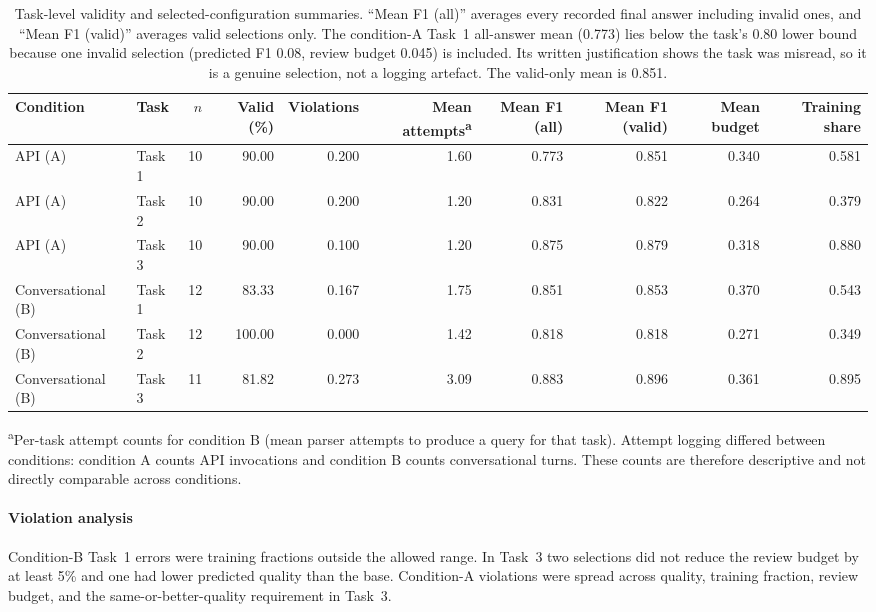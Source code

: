 \documentclass[final,5p,times,twocolumn]{elsarticle}
\begin{document}
\begin{table}[!tb]
\centering
\footnotesize
\caption{Task-level validity and selected-configuration summaries.
``Mean F1 (all)'' averages every recorded final answer including invalid ones, and ``Mean F1 (valid)'' averages valid selections only. The condition-A
Task~1 all-answer mean (0.773) lies below the task's 0.80 lower bound
because one invalid selection (predicted F1 0.08, review budget 0.045) is included. Its written justification shows the task was misread, so it is a genuine selection, not a logging artefact. The valid-only mean is 0.851.}
\label{tab:user-study-validity}
\setlength{\tabcolsep}{2.5pt}
\begin{tabular}{@{}llrrrrrrrr@{}}
\toprule
Condition & Task & $n$ & Valid (\%) & Violations & Mean attempts\textsuperscript{a} &
Mean F1 (all) & Mean F1 (valid) & Mean budget & Training share \\
\midrule
API (A) & Task 1 & 10 & 90.00 & 0.200 & 1.60 & 0.773 & 0.851 & 0.340 & 0.581 \\
API (A) & Task 2 & 10 & 90.00 & 0.200 & 1.20 & 0.831 & 0.822 & 0.264 & 0.379 \\
API (A) & Task 3 & 10 & 90.00 & 0.100 & 1.20 & 0.875 & 0.879 & 0.318 & 0.880 \\
Conversational (B)  & Task 1 & 12 & 83.33 & 0.167 & 1.75 & 0.851 & 0.853 & 0.370 & 0.543 \\
Conversational (B)  & Task 2 & 12 & 100.00 & 0.000 & 1.42 & 0.818 & 0.818 & 0.271 & 0.349 \\
Conversational (B)  & Task 3 & 11 & 81.82 & 0.273 & 3.09 & 0.883 & 0.896 & 0.361 & 0.895 \\
\bottomrule
\end{tabular}
\smallskip

\noindent\textsuperscript{a}Per-task attempt counts for condition B
(mean parser attempts to produce a query for that task). Attempt logging
differed between conditions: condition A counts API invocations and condition B counts conversational turns. These counts are therefore descriptive
and not directly comparable across conditions.
\end{table}

\paragraph{Violation analysis}
Condition-B Task~1 errors were training fractions outside the allowed range. In Task~3 two selections did not reduce the review budget by at
least 5\% and one had lower predicted quality than the base.
Condition-A violations were spread across quality, training fraction,
review budget, and the same-or-better-quality requirement in Task~3.
\end{document}
